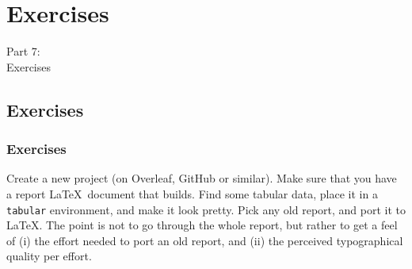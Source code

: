 {
\renewcommand{\bgcolor}{exercises}

\section{Exercises}
\begin{frame}
  \vspace{25mm}
  \begin{center}
    \Huge{Part 7:\\Exercises}
  \end{center}
\end{frame}

\subsection{Exercises}
\begin{frame}[fragile]
  \frametitle{Exercises}
  \vspace{3mm}
  \begin{enumerate}
     Create a new project (on Overleaf, GitHub or similar). Make sure that you have a report \LaTeX\ document that builds.
     Find some tabular data, place it in a \texttt{tabular} environment, and make it look pretty.
     Pick any old report, and port it to \LaTeX. The point is not to go through the whole report, but rather to get a feel of (i) the effort needed to port an old report, and (ii) the perceived typographical quality per effort.
  \end{enumerate}
\end{frame}

}


